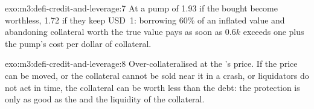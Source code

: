 \begin{solution}{exo:m3:defi-credit-and-leverage:7}
At a pump of 1.93 if the  bought become worthless, 1.72 if they keep USD~1: borrowing 60\% of an inflated value and abandoning collateral worth
the true value pays as soon as $0.6k$ exceeds one plus the pump's cost per dollar of collateral.
\end{solution}

\begin{solution}{exo:m3:defi-credit-and-leverage:8}
Over-collateralised at the 's price. If the price can be moved, or the collateral cannot be sold near it in a crash, or liquidators do not act in
time, the collateral can be worth less than the debt: the protection is only as good as the  and the liquidity of the collateral.
\end{solution}

